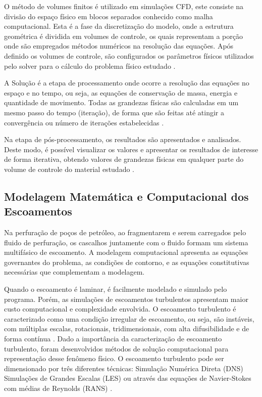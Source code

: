 O método de volumes finitos é utilizado em simulações CFD, este consiste na divisão do espaço físico em blocos separados conhecido como malha computacional. Esta é a fase da discretização do modelo, onde a estrutura geométrica é dividida em volumes de controle, os quais representam a porção onde são empregados métodos numéricos na resolução das equações. Após definido os volumes de controle, são configurados os parâmetros físicos utilizados pelo solver para o cálculo do problema físico estudado \cite{anderson}.

A Solução é a etapa de processamento onde ocorre a resolução das equações no espaço e no tempo, ou seja, as equações de conservação de massa, energia e quantidade de movimento. Todas as grandezas físicas são calculadas em um mesmo passo do tempo (iteração), de forma que são feitas até atingir a convergência ou número de iterações estabelecidas \cite{batchelor}.

Na etapa de pós-processamento, os resultados são apresentados e analisados. Deste modo, é possível visualizar os valores e apresentar os resultados de interesse de forma iterativa, obtendo valores de grandezas físicas em qualquer parte do volume de controle do material estudado \cite{versteeg}.


\subsection{Modelagem Matemática e Computacional dos Escoamentos}

Na perfuração de poços de petróleo, ao fragmentarem e serem carregados pelo fluido de perfuração, os cascalhos juntamente com o fluido formam um sistema multifásico de escoamento. A modelagem computacional apresenta as equações governantes do problema, as condições de contorno, e as equações constitutivas necessárias que complementam a modelagem.

Quando o escoamento é laminar, é facilmente modelado e simulado pelo programa. Porém, as simulações de escoamentos turbulentos apresentam maior custo computacional e complexidade envolvida. O escoamento turbulento é caracterizado como uma condição irregular de escoamento, ou seja, são instáveis, com múltiplas escalas, rotacionais, tridimensionais, com alta difusibilidade e de forma contínua \cite{turb}.
Dado a importância da caracterização de escoamento turbulento, foram desenvolvidos métodos de solução computacional para representação desse fenômeno físico. O escoamento turbulento pode ser dimensionado por três diferentes técnicas: Simulação Numérica Direta (DNS) Simulações de Grandes Escalas (LES) ou através das equações de Navier-Stokes com médias de Reynolds (RANS) \cite{turb}.

